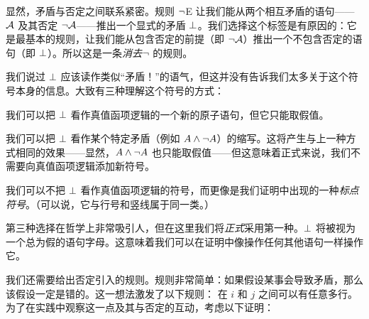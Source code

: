 显然，矛盾与否定之间联系紧密。规则 $\neg$E 让我们能从两个相互矛盾的语句——$\mathcal{A}$ 及其否定 $\neg \mathcal{A}$——推出一个显式的矛盾 $\bot$。我们选择这个标签是有原因的：它是最基本的规则，让我们能从包含否定的前提（即 $\neg\mathcal{A}$）推出一个不包含否定的语句（即 $\bot$）。所以这是一条\emph{消去}$\neg$ 的规则。

我们说过 $\bot$ 应该读作类似“矛盾！”的语气，但这并没有告诉我们太多关于这个符号本身的信息。大致有三种理解这个符号的方式：


\begin{compactlist}
		\item 我们可以把 $\bot$ 看作真值函项逻辑的一个新的原子语句，但它只能取假值。
		\item 我们可以把 $\bot$ 看作某个特定矛盾（例如 $A \wedge \neg A$）的缩写。这将产生与上一种方式相同的效果——显然，$A \wedge \neg A$ 也只能取假值——但这意味着正式来说，我们不需要向真值函项逻辑添加新符号。
		\item 我们可以不把 $\bot$ 看作真值函项逻辑的符号，而更像是我们证明中出现的一种\emph{标点符号}。（可以说，它与行号和竖线属于同一类。）
	\end{compactlist}


第三种选择在哲学上非常吸引人，但在这里我们将\emph{正式}采用第一种。$\bot$ 将被视为一个总为假的语句字母。这意味着我们可以在证明中像操作任何其他语句一样操作它。

我们还需要给出否定引入的规则。规则非常简单：如果假设某事会导致矛盾，那么该假设一定是错的。这一想法激发了以下规则：
在 $i$ 和 $j$ 之间可以有任意多行。为了在实践中观察这一点及其与否定的互动，考虑以下证明：


\begin{fitchproof}
		\AS
		\open
			\AS
		\close
	\end{fitchproof}

